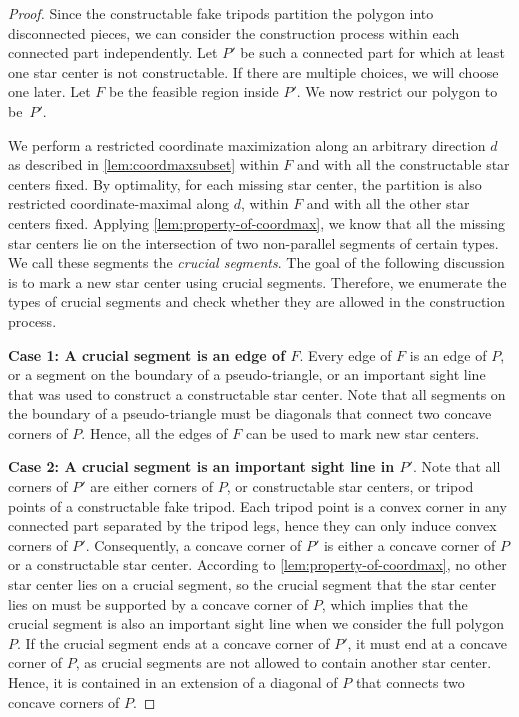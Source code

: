 \documentclass{theoretics}
\begin{document}
\begin{proof}
Since the constructable fake tripods partition the polygon into disconnected pieces, we can consider the construction process within each connected part independently. Let $P'$ be such a connected part for which at least one star center is not constructable. If there are multiple choices, we will choose one later. Let $F$ be the feasible region inside $P'$. We now restrict our polygon to be~$P'$. 

We perform a restricted coordinate maximization along an arbitrary direction $d$ as described in \cref{lem:coordmaxsubset} within $F$ and with all the constructable star centers fixed. 
By optimality, for each missing star center, the partition is also restricted coordinate-maximal along $d$, within $F$ and with all the other star centers fixed.
Applying \cref{lem:property-of-coordmax}, we know that all the missing star centers lie on the intersection of two non-parallel segments of certain types. 
We call these segments the \emph{crucial segments}.
The goal of the following discussion is to mark
a new star center using crucial segments. 
Therefore, we enumerate the types of crucial segments and check whether they are allowed in the construction process.

\textbf{\boldmath Case 1: A crucial segment is an edge of $F$}.
Every edge of $F$ is an edge of $P$, or a segment on the boundary of a pseudo-triangle, or an important sight line that was used to construct a constructable star center.
Note that all segments on the boundary of a pseudo-triangle must be diagonals that connect two concave corners of $P$. Hence, all the edges of $F$ can be used to mark new star centers. 

\textbf{\boldmath Case 2: A crucial segment is an important sight line in $P'$}.
Note that all corners of $P'$ are either corners of $P$, or constructable star centers, or tripod points of a constructable fake tripod. 
Each tripod point is a convex corner in any connected part separated by the tripod legs, hence they can only induce convex corners of $P'$.
Consequently, a concave corner of $P'$ is either a concave corner of $P$ or a constructable star center.
According to \cref{lem:property-of-coordmax}, no other star center lies on a crucial segment, so the crucial segment that the star center lies on must be supported by a concave corner of $P$, which implies that the crucial segment is also an important sight line when we consider the full polygon $P$. 
If the crucial segment ends at a concave corner of $P'$, it must end at a concave corner of $P$, as crucial segments are not allowed to contain another star center. Hence, it is contained in an extension of a diagonal of $P$ that connects two concave corners of $P$. 


\end{proof}
\end{document}

